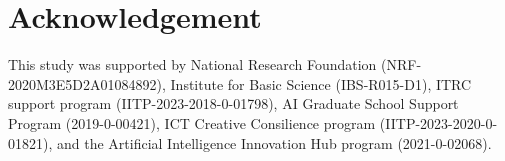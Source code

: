 \documentclass[10pt,twocolumn,letterpaper]{article}
\begin{document}
\section*{Acknowledgement}
This study was supported by National Research Foundation (NRF-2020M3E5D2A01084892), Institute for Basic Science (IBS-R015-D1), ITRC support program (IITP-2023-2018-0-01798), AI Graduate School Support Program (2019-0-00421), ICT Creative Consilience program (IITP-2023-2020-0-01821), and the Artificial Intelligence Innovation Hub program (2021-0-02068).

{
\small


}


\end{document}
